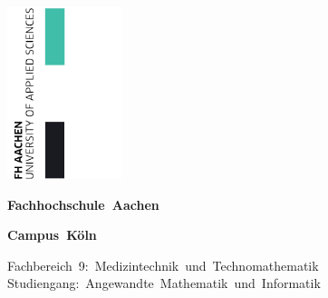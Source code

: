 \begin{titlepage}
	\setlength{\parindent}{0pt} %
	
	\begin{flushright}
		\includegraphics[height=5cm]{images/FH-Aachen-r_svg-raw}
	\end{flushright}
	
	\vspace*{-2.5cm}

	\begin{center}
		\textbf{\Huge Fachhochschule~Aachen}

		\vspace*{0.5cm}
		
		\textbf{\Huge Campus~Köln}

		\vspace*{0.75cm}

		{\normalsize\doublespacing Fachbereich~9:~Medizintechnik~und~Technomathematik\\	Studiengang:~Angewandte~Mathematik~und~Informatik}

		\vspace*{2.5cm} %
		
		\begin{minipage}[t]{17cm} %
			\begin{center}
				\textbf{\Huge \titleDocument}
			\end{center}
		\end{minipage}
	
		\vspace*{2.5cm} %
		

\end{center}
\end{titlepage}
